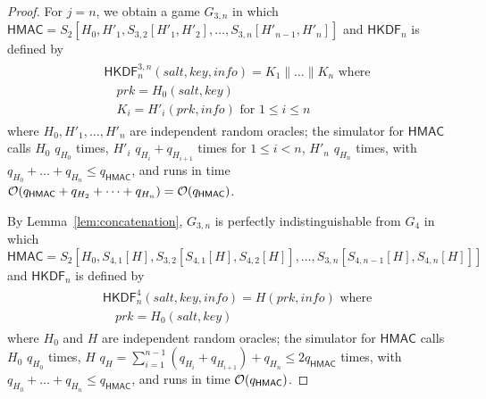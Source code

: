 \documentclass[compsoc, conference, letterpaper, 10pt, times]{IEEEtran}
\newcommand{\HKDF}{\mathsf{HKDF}}
\newcommand{\salt}{\mathit{salt}}
\newcommand{\key}{\mathit{key}}
\newcommand{\info}{\mathit{info}}
\newcommand{\prk}{\mathit{prk}}
\newcommand{\hmac}{\mathsf{HMAC}}
\newcommand{\ab}{\allowbreak}
\begin{document}
\begin{proof}
For $j=n$, we obtain a game $G_{3,n}$  in which
$\hmac = S_2[H_0, H'_1, S_{3,2}[H'_1, H'_2], \dots, S_{3,n}[H'_{n-1}, H'_{n}]]$ and $\HKDF_n$ is defined by
\begin{align*}
\begin{split}
&\HKDF^{3,n}_n(\salt,\key,\info) = K_1 \| \dots \| K_n \text{ where}\\
&\quad \prk = H_0(\salt,\key)\\
&\quad K_i = H'_i(\prk, \info )\text{ for }1 \leq i \leq n
\end{split}
\end{align*}
where $H_0, H'_1, \dots, H'_{n}$ are independent random oracles;
the simulator for $\hmac$ calls 
$H_0$ $q_{H_0}$ times,
$H'_i$ $q_{H_i} + q_{H_{i+1}}$ times for $1 \leq i < n$,
$H'_{n}$ $q_{H_{n}}$ times, with
$q_{H_0} + \dots + q_{H_n} \leq q_{\hmac}$, and runs in time 
${\cal O}(q_{\hmac} + q_{H_2} + \dots + q_{H_{n}}) = {\cal O}(q_{\hmac})$.

By Lemma~\ref{lem:concatenation}, $G_{3,n}$ is perfectly indistinguishable
from $G_4$ in which
$\hmac = S_2[H_0, \ab S_{4,1}[H], \ab S_{3,2}[S_{4,1}[H], S_{4,2}[H]], \ab \dots, \ab S_{3,n}[S_{4,n-1}[H], S_{4,n}[H]]]$ and $\HKDF_n$ is defined by
\begin{align*}
\begin{split}
&\HKDF^4_n(\salt,\key,\info) = H(\prk, \info) \text{ where}\\
&\quad \prk = H_0(\salt,\key)
\end{split}
\end{align*}
where $H_0$ and $H$ are independent random oracles;
the simulator for $\hmac$ calls 
$H_0$ $q_{H_0}$ times,
$H$ $q_H = \sum_{i = 1}^{n-1} (q_{H_i} + q_{H_{i+1}}) + q_{H_n} \leq 2 q_{\hmac}$ times,
with $q_{H_0} + \dots + q_{H_n} \leq q_{\hmac}$, and runs in time 
${\cal O}(q_{\hmac})$.


\end{proof}
\end{document}
